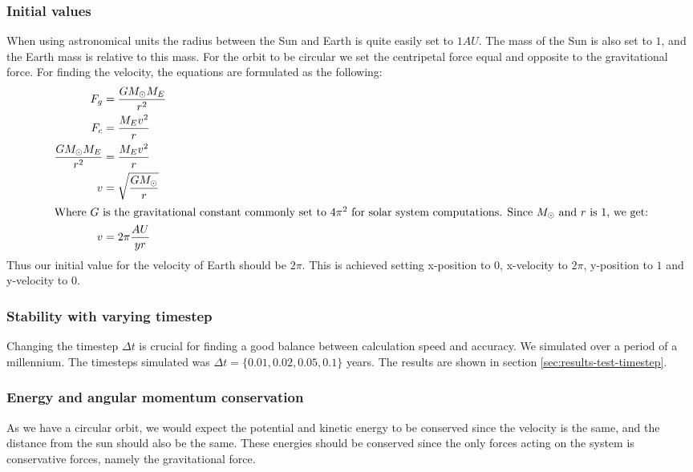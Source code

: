\documentclass[../main.tex]{subfiles}
\begin{document}
\subsubsection{Initial values}
When using astronomical units the radius between the Sun and Earth is quite easily set to $1AU$. The mass of the Sun is also set to $1$, and the Earth mass is relative to this mass. For the orbit to be circular we set the centripetal force equal and opposite to the gravitational force. For finding the velocity, the equations are formulated as the following:
\begin{align}
  F_g &= \frac{G M_\odot M_E}{r^2}\nonumber \\
  F_c &= \frac{M_E v^2}{r}\nonumber \\
  \frac{G M_\odot M_E}{r^2} &= \frac{M_E v^2}{r}\nonumber \\
  v &= \sqrt{\frac{G M_\odot}{r}}\nonumber \\
  \intertext{Where $G$ is the gravitational constant commonly set to $4\pi^2$ for solar system computations. Since $M_\odot$ and $r$ is $1$, we get:}
  v &= 2\pi \frac{AU}{yr}
\end{align}
Thus our initial value for the velocity of Earth should be $2\pi$. This is achieved setting x-position to $0$, x-velocity to $2\pi$, y-position to $1$ and y-velocity to $0$.

\subsubsection{Stability with varying timestep}
Changing the timestep $\Delta t$ is crucial for finding a good balance between calculation speed and accuracy. We simulated over a period of a millennium. The timesteps simulated was $\Delta t = \{0.01, 0.02, 0.05, 0.1\}$ years. The results are shown in section \ref{sec:results-test-timestep}.

\subsubsection{Energy and angular momentum conservation}
As we have a circular orbit, we would expect the potential and kinetic energy to be conserved since the velocity is the same, and the distance from the sun should also be the same. These energies should be conserved since the only forces acting on the system is conservative forces, namely the gravitational force.
\end{document}
